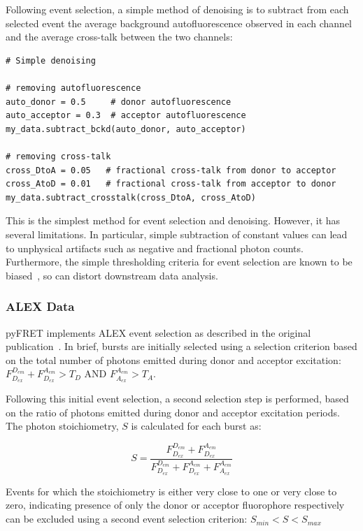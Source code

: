 Following event selection, a simple method of denoising is to subtract from each selected event the average background autofluorescence observed in each channel and the average cross-talk between the two channels:

\begin{lstlisting}
# Simple denoising

# removing autofluorescence
auto_donor = 0.5     # donor autofluorescence
auto_acceptor = 0.3  # acceptor autofluorescence
my_data.subtract_bckd(auto_donor, auto_acceptor)

# removing cross-talk
cross_DtoA = 0.05   # fractional cross-talk from donor to acceptor
cross_AtoD = 0.01   # fractional cross-talk from acceptor to donor
my_data.subtract_crosstalk(cross_DtoA, cross_AtoD)
\end{lstlisting}

This is the simplest method for event selection and denoising. However, it has several limitations. In particular, simple subtraction of constant values can lead to unphysical artifacts such as negative and fractional photon counts. Furthermore, the simple thresholding criteria for event selection are known to be biased~\cite{nir06}, so can distort downstream data analysis. 

\subsubsection{ALEX Data}
pyFRET implements ALEX event selection as described in the original publication~\cite{lee06}. In brief, bursts are initially selected using a selection criterion based on the total number of photons emitted during donor and acceptor excitation:
 $F_{D_{ex}}^{D_{em}} + F_{D_{ex}}^{A_{em}} > T_D$ AND $F_{A_{ex}}^{A_{em}} > T_A$.

 Following this initial event selection, a second selection step is performed, based on the ratio of photons emitted during donor and acceptor excitation periods. The photon stoichiometry, $S$ is calculated for each burst as:

\begin{equation}
S = \frac{F_{D_{ex}}^{D_{em}} + F_{D_{ex}}^{A_{em}}}{F_{D_{ex}}^{D_{em}} + F_{D_{ex}}^{A_{em}} + F_{A_{ex}}^{A_{em}}}
\label{eq:Eprod_ALEX}
\end{equation}

Events for which the stoichiometry is either very close to one or very close to zero, indicating presence of only the donor or acceptor fluorophore respectively can be excluded using a second event selection criterion: $S_{min} < S < S_{max}$

